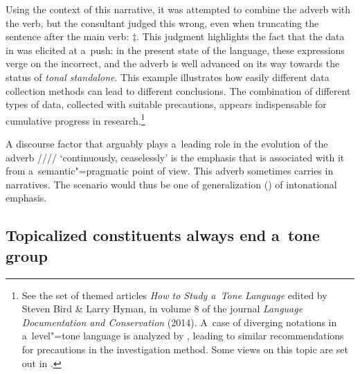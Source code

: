 Using the context of this narrative, it was attempted to combine the adverb with the verb, but the
consultant judged this wrong, even when truncating the sentence after the main verb: $\ddagger${\kern2pt}. This judgment highlights the fact that the data in  was elicited at a~push: in
the present state of the language, these expressions verge on the incorrect, and the adverb is well advanced on
its way towards the status of \textit{tonal standalone}. This example illustrates how easily different data
collection methods can lead to different conclusions. The combination of different types of data,
collected with suitable precautions, appears indispensable for cumulative progress in
research.\footnote{See the set of themed articles \textit{How to Study a~Tone Language} edited by Steven Bird \& Larry Hyman, in volume 8 of the journal
  \textit{Language Documentation and Conservation} (2014). A~case of diverging notations in
  a~level"=tone language is analyzed by \citet{roux2003}, leading to similar recommendations for
  precautions in the investigation method. Some views on this topic are set out in
  \citet{niebuhretal2015}.}

A discourse factor that arguably plays a~leading role in the evolution of the adverb //// ‘continuously, ceaselessly’ is the emphasis that is associated with
it from a~semantic"=pragmatic point of view. This adverb sometimes carries
 in narratives. The scenario would thus be one of generalization () of intonational emphasis.


\subsection{Topicalized constituents always end a~tone group}
\label{sec:atonegroupboundaryisalwaysfoundaftertopicalizedphrases}


